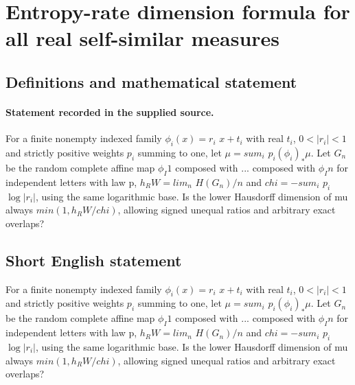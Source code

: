 \documentclass[11pt]{article}
\begin{document}
\section*{Entropy-rate dimension formula for all real self-similar measures}\label{statement}
\subsection{Definitions and mathematical statement}
\paragraph{Statement recorded in the supplied source.}
For a finite nonempty indexed family $\phi _i(x)=r_i$ $x+t_i$ with real $t_i$, $0<|r_i|<1$ and strictly positive weights $p_i$ summing to one, let $\mu =sum_i$ $p_i(\phi _i)_*\mu $. Let $G_n$ be the random complete affine map $\phi _I1$ composed with ... composed with $\phi _In$ for independent letters with law p, $h_RW=lim_n$ $H(G_n)/n$ and $chi=-sum_i$ $p_i$ $\log |r_i|$, using the same logarithmic base. Is the lower Hausdorff dimension of mu always $min(1,h_RW/chi)$, allowing signed unequal ratios and arbitrary exact overlaps?
\subsection{Short English statement}
For a finite nonempty indexed family $\phi _i(x)=r_i$ $x+t_i$ with real $t_i$, $0<|r_i|<1$ and strictly positive weights $p_i$ summing to one, let $\mu =sum_i$ $p_i(\phi _i)_*\mu $. Let $G_n$ be the random complete affine map $\phi _I1$ composed with ... composed with $\phi _In$ for independent letters with law p, $h_RW=lim_n$ $H(G_n)/n$ and $chi=-sum_i$ $p_i$ $\log |r_i|$, using the same logarithmic base. Is the lower Hausdorff dimension of mu always $min(1,h_RW/chi)$, allowing signed unequal ratios and arbitrary exact overlaps?
\end{document}
